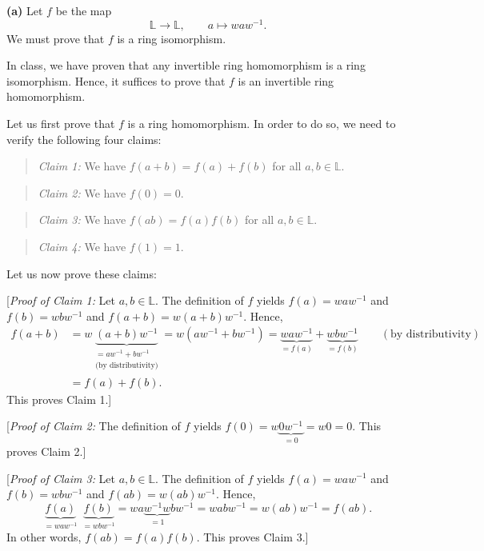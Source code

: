 \documentclass[paper=a4, fontsize=12pt]{scrartcl}%
\theoremstyle{plainsl}
\theoremstyle{definition}
\theoremstyle{remark}
\newenvironment{statement}{\begin{quote}}{\end{quote}}
\begin{document}
\textbf{(a)} Let $f$ be the map%
\[
\mathbb{L}\rightarrow\mathbb{L},\qquad a\mapsto waw^{-1}.
\]
We must prove that $f$ is a ring isomorphism.

In class, we have proven that any invertible ring homomorphism is a ring
isomorphism. Hence, it suffices to prove that $f$ is an invertible ring homomorphism.

Let us first prove that $f$ is a ring homomorphism. In order to do so, we need
to verify the following four claims:

\begin{statement}
\textit{Claim 1:} We have $f\left(  a+b\right)  =f\left(  a\right)  +f\left(
b\right)  $ for all $a,b\in\mathbb{L}$.
\end{statement}

\begin{statement}
\textit{Claim 2:} We have $f\left(  0\right)  =0$.
\end{statement}

\begin{statement}
\textit{Claim 3:} We have $f\left(  ab\right)  =f\left(  a\right)  f\left(
b\right)  $ for all $a,b\in\mathbb{L}$.
\end{statement}

\begin{statement}
\textit{Claim 4:} We have $f\left(  1\right)  =1$.
\end{statement}

Let us now prove these claims:

[\textit{Proof of Claim 1:} Let $a,b\in\mathbb{L}$. The definition of $f$
yields $f\left(  a\right)  =waw^{-1}$ and $f\left(  b\right)  =wbw^{-1}$ and
$f\left(  a+b\right)  =w\left(  a+b\right)  w^{-1}$. Hence,%
\begin{align*}
f\left(  a+b\right)   &  =w\underbrace{\left(  a+b\right)  w^{-1}%
}_{\substack{=aw^{-1}+bw^{-1}\\\text{(by distributivity)}}}=w\left(
aw^{-1}+bw^{-1}\right)  =\underbrace{waw^{-1}}_{=f\left(  a\right)
}+\underbrace{wbw^{-1}}_{=f\left(  b\right)  }\qquad\left(  \text{by
distributivity}\right) \\
&  =f\left(  a\right)  +f\left(  b\right)  .
\end{align*}
This proves Claim 1.]

[\textit{Proof of Claim 2:} The definition of $f$ yields $f\left(  0\right)
=w\underbrace{0w^{-1}}_{=0}=w0=0$. This proves Claim 2.]

[\textit{Proof of Claim 3:} Let $a,b\in\mathbb{L}$. The definition of $f$
yields $f\left(  a\right)  =waw^{-1}$ and $f\left(  b\right)  =wbw^{-1}$ and
$f\left(  ab\right)  =w\left(  ab\right)  w^{-1}$. Hence,%
\[
\underbrace{f\left(  a\right)  }_{=waw^{-1}}\ \ \underbrace{f\left(  b\right)
}_{=wbw^{-1}}=wa\underbrace{w^{-1}w}_{=1}bw^{-1}=wabw^{-1}=w\left(  ab\right)
w^{-1}=f\left(  ab\right)  .
\]
In other words, $f\left(  ab\right)  =f\left(  a\right)  f\left(  b\right)  $.
This proves Claim 3.]
\end{document}
